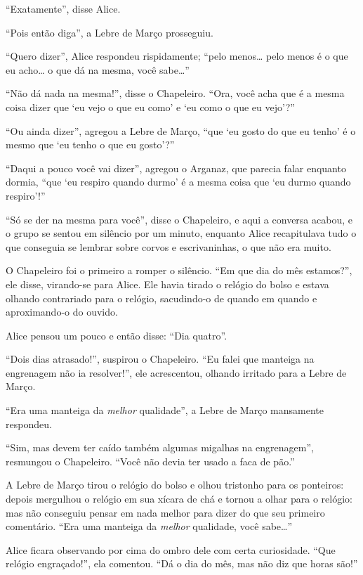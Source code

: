 ``Exatamente'', disse Alice.

``Pois então diga'', a Lebre de Março prosseguiu.

``Quero dizer'', Alice respondeu rispidamente; ``pelo menos\ldots{} pelo
menos é o que eu acho\ldots{} o que dá na mesma, você sabe\ldots{}''

``Não dá nada na mesma!'', disse o Chapeleiro. ``Ora, você acha que é a
mesma coisa dizer que `eu vejo o que eu como' e `eu como o que eu
vejo'?''

``Ou ainda dizer'', agregou a Lebre de Março, ``que `eu gosto do que eu
tenho' é o mesmo que `eu tenho o que eu gosto'?''

``Daqui a pouco você vai dizer'', agregou o Arganaz, que parecia falar
enquanto dormia, ``que `eu respiro quando durmo' é a mesma coisa que `eu
durmo quando respiro'!''

``Só se der na mesma para você'', disse o Chapeleiro, e aqui a conversa
acabou, e o grupo se sentou em silêncio por um minuto, enquanto Alice
recapitulava tudo o que conseguia se lembrar sobre corvos e
escrivaninhas, o que não era muito.

O Chapeleiro foi o primeiro a romper o silêncio. ``Em que dia do mês
estamos?'', ele disse, virando-se para Alice. Ele havia tirado o relógio
do bolso e estava olhando contrariado para o relógio, sacudindo-o de
quando em quando e aproximando-o do ouvido.

Alice pensou um pouco e então disse: ``Dia quatro''.

``Dois dias atrasado!'', suspirou o Chapeleiro. ``Eu falei que manteiga
na engrenagem não ia resolver!'', ele acrescentou, olhando irritado para
a Lebre de Março.

``Era uma manteiga da \emph{melhor} qualidade'', a Lebre de Março
mansamente respondeu.

``Sim, mas devem ter caído também algumas migalhas na engrenagem'',
resmungou o Chapeleiro. ``Você não devia ter usado a faca de pão.''

A Lebre de Março tirou o relógio do bolso e olhou tristonho para os
ponteiros: depois mergulhou o relógio em sua xícara de chá e tornou a
olhar para o relógio: mas não conseguiu pensar em nada melhor para dizer
do que seu primeiro comentário. ``Era uma manteiga da \emph{melhor}
qualidade, você sabe\ldots{}''

Alice ficara observando por cima do ombro dele com certa curiosidade.
``Que relógio engraçado!'', ela comentou. ``Dá o dia do mês, mas não diz
que horas são!''


